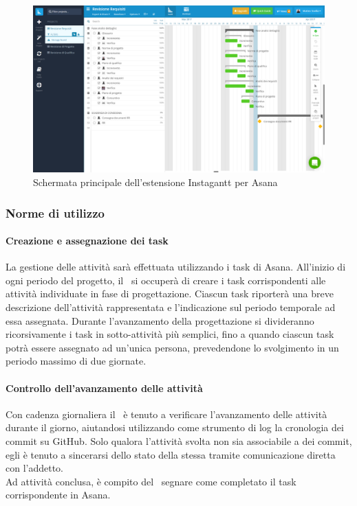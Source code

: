 \documentclass[../NormeDiProgetto.tex]{subfiles}
\begin{document}
				\begin{figure} [h!]
					\centering
					\includegraphics[scale=0.2]{./Immagini/Instagantt.png}
					\caption{Schermata principale dell'estensione Instagantt per Asana}\label{}
				\end{figure}
				\subsubsection{Norme di utilizzo}
				\paragraph{Creazione e assegnazione dei task\\}
					La gestione delle attività sarà effettuata utilizzando i task di Asana.
					All'inizio di ogni periodo del progetto, il \responsabilediprogetto\ si occuperà di creare i task corrispondenti alle attività individuate in fase di progettazione. Ciascun task riporterà una breve descrizione dell'attività rappresentata e l'indicazione sul periodo temporale ad essa assegnata. Durante l'avanzamento della progettazione si divideranno ricorsivamente i task in sotto-attività più semplici, fino a quando ciascun task potrà essere assegnato ad un'unica persona, prevedendone lo svolgimento in un periodo massimo di due giornate.
				\paragraph{Controllo dell'avanzamento delle attività\\}
					Con cadenza giornaliera il \responsabilediprogetto\ è tenuto a verificare l'avanzamento delle attività durante il giorno, aiutandosi utilizzando come strumento di log la cronologia dei commit su GitHub. Solo qualora l'attività svolta non sia associabile a dei commit, egli è tenuto a sincerarsi dello stato della stessa tramite comunicazione diretta con l'addetto.\\
					Ad attività conclusa, è compito del \responsabilediprogetto\ segnare come completato il task corrispondente in Asana.
\end{document}
